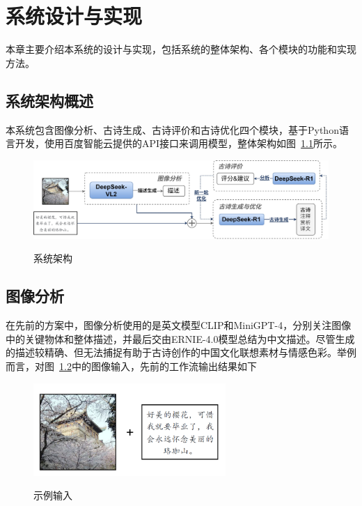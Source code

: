 
\chapter{系统设计与实现}




本章主要介绍本系统的设计与实现，包括系统的整体架构、各个模块的功能和实现方法。

\section{系统架构概述}
本系统包含图像分析、古诗生成、古诗评价和古诗优化四个模块，基于Python语言开发，使用百度智能云提供的API接口来调用模型，整体架构如图~\ref{fig:system_architecture}所示。


\begin{figure}[h]
    \centering
    \includegraphics[width=1\textwidth]
    {figures/系统架构.jpg}\\
    \caption{系统架构}
    \label{fig:system_architecture}
  \end{figure}

\section{图像分析} \label{sec:image_analysis}

在先前的方案中，图像分析使用的是英文模型CLIP和MiniGPT-4，分别关注图像中的关键物体和整体描述，并最后交由ERNIE-4.0模型总结为中文描述。尽管生成的描述较精确、但无法捕捉有助于古诗创作的中国文化联想素材与情感色彩。举例而言，对图~\ref{fig:example_input}中的图像输入，先前的工作流输出结果如下%

\begin{figure}[ht]
  \centering
  \includegraphics[width=0.65\textwidth]
  {figures/示例输入.png}\\
  \caption{示例输入}
  \label{fig:example_input} %
\end{figure}


